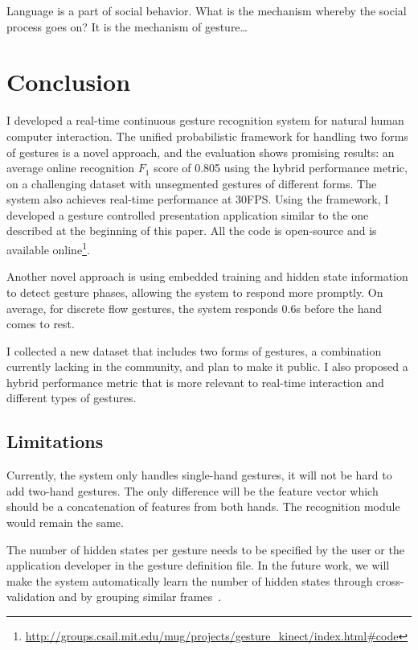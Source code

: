 \begin{savequote}
Language is a part of social behavior. What is the mechanism whereby the social
process goes on? It is the mechanism of gesture\ldots
{}
\end{savequote}
\chapter{Conclusion}
I developed a real-time continuous gesture recognition system for natural
human computer interaction. The
unified probabilistic framework for handling two forms of gestures is a novel
approach, and the evaluation shows promising results: an
average online recognition $F_1$ score of 0.805 using the hybrid performance
metric, on a challenging dataset with unsegmented gestures of different forms.
The system also achieves real-time performance at 30FPS. Using the framework, I
developed a gesture controlled presentation application similar to the one described at the beginning of this paper. All the code is open-source
and is available
online\footnote{\url{http://groups.csail.mit.edu/mug/projects/gesture_kinect/index.html\#code}}.

Another novel approach is using embedded training and hidden state information
to detect gesture phases, allowing the system to respond more promptly. On
average, for discrete flow gestures, the system responds 0.6s before the hand comes to
rest. 

I collected a new dataset that includes two forms of gestures, a
combination currently lacking in the community, and plan to make it
public. I also proposed a hybrid performance metric
that is more relevant to real-time interaction and different types of gestures.

\section{Limitations}
Currently, the system only handles single-hand gestures, it will not be hard to
add two-hand gestures. The only difference will be the feature vector which
should be a concatenation of features from both hands. The recognition module
would remain the same.

The number of hidden states per gesture needs to be specified by the user or the
application developer in the gesture definition file. In the future work, we
will make the system automatically learn the number of hidden states through
cross-validation and by grouping similar frames~\cite{song13}.

